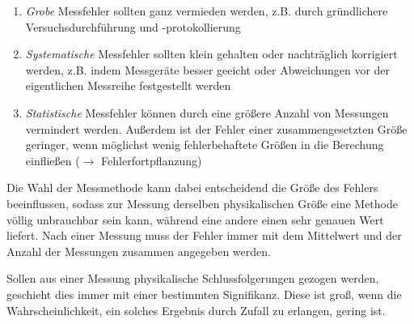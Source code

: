 \begin{enumerate}
  \item \emph{Grobe} Messfehler sollten ganz vermieden werden, z.B. durch gründlichere Versuchsdurchführung und -protokollierung
  \item \emph{Systematische} Messfehler sollten klein gehalten oder nachträglich korrigiert werden, z.B. indem Messgeräte besser geeicht oder Abweichungen vor der eigentlichen Messreihe festgestellt werden
  \item \emph{Statistische} Messfehler können durch eine größere Anzahl von Messungen vermindert werden. Außerdem ist der Fehler einer zusammengesetzten Größe geringer, wenn möglichst wenig fehlerbehaftete Größen in die Berechung einfließen ($\rightarrow$ Fehlerfortpflanzung)
\end{enumerate}

Die Wahl der Messmethode kann dabei entscheidend die Größe des Fehlers beeinflussen, sodass zur Messung derselben physikalischen Größe eine Methode völlig unbrauchbar sein kann, während eine andere einen sehr genauen Wert liefert. 
Nach einer Messung muss der Fehler immer mit dem Mittelwert und der Anzahl der Messungen zusammen angegeben werden.

Sollen aus einer Messung physikalische Schlussfolgerungen gezogen werden, geschieht dies immer mit einer bestimmten Signifikanz. Diese ist groß, wenn die Wahrscheinlichkeit, ein solches Ergebnis durch Zufall zu erlangen, gering ist.

\nocite{anleitung-ws2014}
